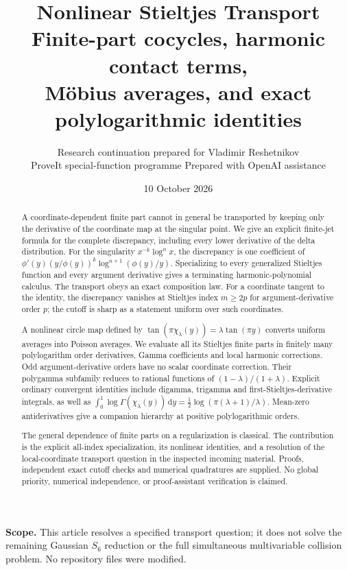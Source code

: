 \documentclass[11pt]{article}
\title{\textbf{Nonlinear Stieltjes Transport}\\[5pt]
\large Finite-part cocycles, harmonic contact terms,\\
M\"obius averages, and exact polylogarithmic identities}
\author{Research continuation prepared for Vladimir Reshetnikov\\
\small ProveIt special-function programme \quad\textbullet\quad Prepared with OpenAI assistance}
\date{10 October 2026}
\theoremstyle{definition}\newtheorem{definition}[theorem]{Definition}
\theoremstyle{remark}\newtheorem{remark}[theorem]{Remark}
\newcommand{\dd}{\,\mathrm d}
\begin{document}
\maketitle
\begin{abstract}
A coordinate-dependent finite part cannot in general be transported by keeping only the derivative of the coordinate map at the singular point. We give an explicit finite-jet formula for the complete discrepancy, including every lower derivative of the delta distribution. For the singularity $x^{-k}\log^n x$, the discrepancy is one coefficient of
$\phi'(y)(y/\phi(y))^k\log^{n+1}(\phi(y)/y)$.
Specializing to every generalized Stieltjes function and every argument derivative gives a terminating harmonic-polynomial calculus. The transport obeys an exact composition law. For a coordinate tangent to the identity, the discrepancy vanishes at Stieltjes index $m\ge2p$ for argument-derivative order $p$; the cutoff is sharp as a statement uniform over such coordinates.

A nonlinear circle map defined by $\tan(\pi\chi_\lambda(y))=\lambda\tan(\pi y)$ converts uniform averages into Poisson averages. We evaluate all its Stieltjes finite parts in finitely many polylogarithm order derivatives, Gamma coefficients and local harmonic corrections. Odd argument-derivative orders have no scalar coordinate correction. Their polygamma subfamily reduces to rational functions of $(1-\lambda)/(1+\lambda)$. Explicit ordinary convergent identities include digamma, trigamma and first-Stieltjes-derivative integrals, as well as
$\int_0^1\log\Gamma(\chi_\lambda(y))\dd y=\tfrac12\log(\pi(\lambda+1)/\lambda)$.
Mean-zero antiderivatives give a companion hierarchy at positive polylogarithmic orders.

The general dependence of finite parts on a regularization is classical. The contribution is the explicit all-index specialization, its nonlinear identities, and a resolution of the local-coordinate transport question in the inspected incoming material. Proofs, independent exact cutoff checks and numerical quadratures are supplied. No global priority, numerical independence, or proof-assistant verification is claimed.
\end{abstract}
\vspace{3pt}
\noindent\textbf{Scope.} This article resolves a specified transport question; it does not solve the remaining Gaussian $S_6$ reduction or the full simultaneous multivariable collision problem. No repository files were modified.
\clearpage
\setcounter{tocdepth}{1}
\tableofcontents
\clearpage
\end{document}
